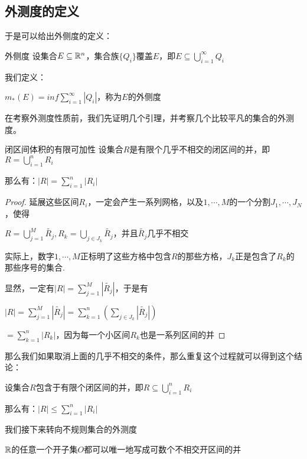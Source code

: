 \documentclass[12pt, a4paper, oneside, UTF8]{ctexbook}
\begin{document}
			\subsection{外测度的定义}
			于是可以给出外侧度的定义：
			\begin{defn}{外侧度}{}
				设集合$E \subseteq \mathbb{R}^n$，集合族$\{Q_i\}$覆盖$E$，即$E \subseteq \bigcup\limits_{i=1}^{\infty} Q_i$
				
				我们定义：
				
				$m_*(E) = inf \sum\limits_{i=1}^{\infty} |Q_i|$，称为$E$的外侧度
			\end{defn}
			在考察外测度性质前，我们先证明几个引理，并考察几个比较平凡的集合的外测度。
			\begin{lemma}{闭区间体积的有限可加性}{}
				设集合$R$是有限个几乎不相交的闭区间的并，即$R = \bigcup\limits_{i=1}^{n} R_i$
				
				那么有：$|R| = \sum\limits_{i=1}^{n} |R_i|$
			\end{lemma}
			\begin{proof}
				延展这些区间$R_i$，一定会产生一系列网格，以及${1,\cdots,M}$的一个分割$J_1,\cdots,J_N$，使得
				
				$R = \bigcup\limits_{j=1}^{M} \tilde{R_j},R_k = \bigcup\limits_{j \in J_k} \tilde{R_j}$，并且$\tilde{R_j}$几乎不相交
				
				实际上，数字$1,\cdots,M$正标明了这些方格中包含$R$的那些方格，$J_k$正是包含了$R_k$的那些序号的集合.
				
				显然，一定有$|R|=\sum\limits_{j=1}^{M} |\tilde{R_j}|$，于是有
				
				$|R| = \sum\limits_{j=1}^{M} |\tilde{R_j}| = \sum\limits_{k=1}^{n} \left(\sum\limits_{j \in J_k} |\tilde{R_j}|\right)$
				
				$=\sum\limits_{k=1}^{n} |R_k|$，因为每一个小区间$R_k$也是一系列区间的并
			\end{proof}
			那么我们如果取消上面的几乎不相交的条件，那么重复这个过程就可以得到这个结论：
			\begin{corollary}{}{}
				设集合$R$包含于有限个闭区间的并，即$R  \subseteq \bigcup\limits_{i=1}^{n} R_i$
				
				那么有：$|R| \leqslant \sum\limits_{i=1}^{n} |R_i|$
			\end{corollary}
			我们接下来转向不规则集合的外测度
			\begin{them}{}{}
				$\mathbb{R}$的任意一个开子集$O$都可以唯一地写成可数个不相交开区间的并
			\end{them}
\end{document}

